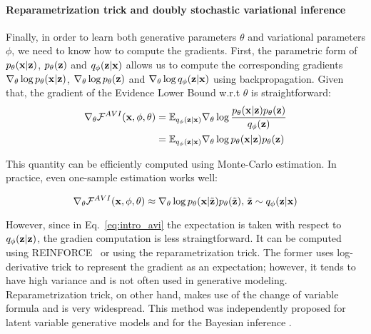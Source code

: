 \paragraph{Reparametrization trick and doubly stochastic variational inference}
Finally, in order to learn both generative parameters $\theta$ and variational parameters $\phi$, we need to know how to compute the gradients. First, the parametric form of $p_{\theta}({\mathbf{x}}|{\mathbf{z}})$, $p_{\theta}({\mathbf{z}})$ and $q_{\phi}({\mathbf{z}}|{\mathbf{x}})$ allows us to compute the corresponding gradients $\nabla_{\theta}\log p_{\theta}({\mathbf{x}}|{\mathbf{z}})$, $\nabla_{\theta}\log p_{\theta}({\mathbf{z}})$ and $\nabla_{\theta}\log q_{\phi}({\mathbf{z}}|{\mathbf{x}})$ using backpropagation. Given that, the gradient of the Evidence Lower Bound w.r.t $\theta$ is straightforward:
\begin{equation}
    \begin{aligned}
      \nabla_{\theta}\mathcal{F}^{AVI}({\mathbf{x}}, \phi, \theta) 
      &= \mathbb{E}_{q_{\phi}({\mathbf{z}}|{\mathbf{x}})} \nabla_{\theta} \log  \frac{p_{\theta}({\mathbf{x}}|{\mathbf{z}})p_{\theta}({\mathbf{z}})}{q_{\phi}({\mathbf{z}})} \\
      &= \mathbb{E}_{q_{\phi}({\mathbf{z}}|{\mathbf{x}})} \nabla_{\theta} \log p_{\theta}({\mathbf{x}}|{\mathbf{z}})p_{\theta}({\mathbf{z}})
    \end{aligned}
\end{equation}

This quantity can be efficiently computed using Monte-Carlo estimation. In practice, even one-sample estimation works well:

\begin{equation}
    \nabla_{\theta}\mathcal{F}^{AVI}({\mathbf{x}}, \phi, \theta) \approx \nabla_{\theta} \log p_{\theta}({\mathbf{x}}|\tilde{{\mathbf{z}}})p_{\theta}(\tilde{{\mathbf{z}}}),\, \tilde{{\mathbf{z}}} \sim q_{\phi}({\mathbf{z}}|{\mathbf{x}})
\end{equation}

However, since in Eq.~\ref{eq:intro_avi} the expectation is taken with respect to $q_{\phi}({\mathbf{z}}|{\mathbf{z}})$, the gradien computation is less straingtforward. It can be computed using REINFORCE~\citep{williams1992simple} or using the reparametrization trick.  The former uses log-derivative trick to represent the gradient as an expectation; however, it tends to have high variance and is not often used in generative modeling. Reparametrization trick, on other hand, makes use of the change of variable formula and is very widespread. This method was independently proposed for latent variable generative models \cite{kingma2014autoencoding, rezende2014stochastic} and for the Bayesian inference \citep{titsias2014doubly}. 

